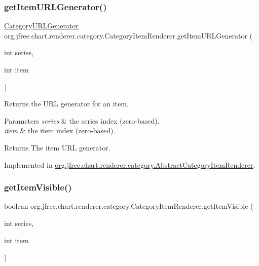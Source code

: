 \subsubsection{\texorpdfstring{get\+Item\+U\+R\+L\+Generator()}{getItemURLGenerator()}}
{\footnotesize\ttfamily \mbox{\hyperlink{interfaceorg_1_1jfree_1_1chart_1_1urls_1_1_category_u_r_l_generator}{Category\+U\+R\+L\+Generator}} org.\+jfree.\+chart.\+renderer.\+category.\+Category\+Item\+Renderer.\+get\+Item\+U\+R\+L\+Generator (\begin{DoxyParamCaption}\item[{int}]{series,  }\item[{int}]{item }\end{DoxyParamCaption})}

Returns the U\+RL generator for an item.


\begin{DoxyParams}{Parameters}
{\em series} & the series index (zero-\/based). \\
\hline
{\em item} & the item index (zero-\/based).\\
\hline
\end{DoxyParams}
\begin{DoxyReturn}{Returns}
The item U\+RL generator. 
\end{DoxyReturn}


Implemented in \mbox{\hyperlink{classorg_1_1jfree_1_1chart_1_1renderer_1_1category_1_1_abstract_category_item_renderer_a2fbd46ccfc0819544b8a1d4efe2e0e95}{org.\+jfree.\+chart.\+renderer.\+category.\+Abstract\+Category\+Item\+Renderer}}.

\mbox{\label{interfaceorg_1_1jfree_1_1chart_1_1renderer_1_1category_1_1_category_item_renderer_a133207e3de61ddc33a1fc987c72ecd1f}} 
\subsubsection{\texorpdfstring{get\+Item\+Visible()}{getItemVisible()}}
{\footnotesize\ttfamily boolean org.\+jfree.\+chart.\+renderer.\+category.\+Category\+Item\+Renderer.\+get\+Item\+Visible (\begin{DoxyParamCaption}\item[{int}]{series,  }\item[{int}]{item }\end{DoxyParamCaption})}

